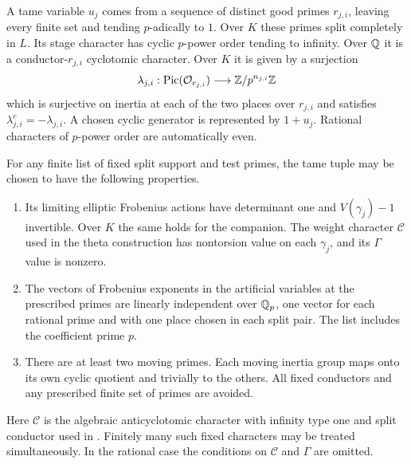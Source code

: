 A tame variable $u_j$ comes from a sequence of distinct good primes
$r_{j,i}$, leaving every finite set and tending $p$-adically to $1$.
Over $K$ these primes split completely in $L$.  Its stage character
has cyclic $p$-power order tending to infinity.  Over $\mathbb Q$ it is a
conductor-$r_{j,i}$ cyclotomic character.  Over $K$ it is given by a
surjection
\[
 \lambda_{j,i}:\operatorname{Pic}(\mathcal O_{r_{j,i}})\longrightarrow\mathbb Z/p^{n_{j,i}}\mathbb Z
\]
which is surjective on inertia at each of the two places over
$r_{j,i}$ and satisfies $\lambda_{j,i}^c=-\lambda_{j,i}$.  A chosen
cyclic generator is represented by $1+u_j$.  Rational characters of
$p$-power order are automatically even.

\begin{lemma}\label{vertical:auxiliary-tuples}
For any finite list of fixed split support and test primes, the tame
tuple may be chosen to have the following properties.
\begin{enumerate}
\item Its limiting elliptic Frobenius actions have determinant one
and $V(\gamma_j)-1$ invertible.  Over $K$ the same holds for the
companion.  The weight character $\mathcal C$ used in the theta
construction has nontorsion value on each $\gamma_j$, and its
$\Gamma$ value is nonzero.
\item The vectors of Frobenius exponents in the artificial variables
at the prescribed primes are linearly independent over $\mathbb Q_p$,
one vector for each rational prime and with one place chosen in
each split pair.  The list includes the coefficient prime $p$.
\item There are at least two moving primes.  Each moving inertia
group maps onto its own cyclic quotient and trivially to the
others.  All fixed conductors and any prescribed finite set of
primes are avoided.
\end{enumerate}
Here $\mathcal C$ is the algebraic anticyclotomic character with
infinity type one and split conductor used in
\cite[Sections 2 and 4]{C}.  Finitely many such fixed characters may
be treated simultaneously.  In the rational case the conditions on
$\mathcal C$ and $\Gamma$ are omitted.
\end{lemma}

